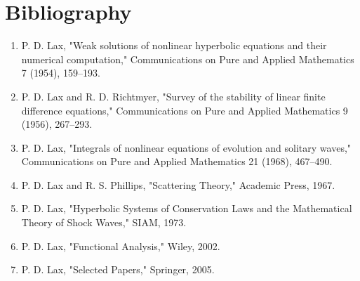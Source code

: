 \section*{Bibliography}

\begin{enumerate}
\item P. D. Lax, "Weak solutions of nonlinear hyperbolic equations and their numerical computation," Communications on Pure and Applied Mathematics 7 (1954), 159--193.
\item P. D. Lax and R. D. Richtmyer, "Survey of the stability of linear finite difference equations," Communications on Pure and Applied Mathematics 9 (1956), 267--293.
\item P. D. Lax, "Integrals of nonlinear equations of evolution and solitary waves," Communications on Pure and Applied Mathematics 21 (1968), 467--490.
\item P. D. Lax and R. S. Phillips, "Scattering Theory," Academic Press, 1967.
\item P. D. Lax, "Hyperbolic Systems of Conservation Laws and the Mathematical Theory of Shock Waves," SIAM, 1973.
\item P. D. Lax, "Functional Analysis," Wiley, 2002.
\item P. D. Lax, "Selected Papers," Springer, 2005.
\end{enumerate}
